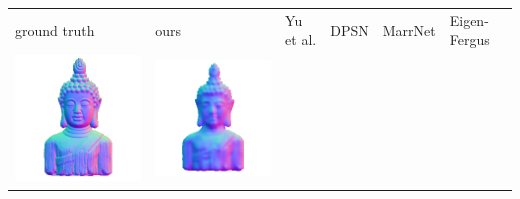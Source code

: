 \begin{center}
\begin{tabularx}{\linewidth}{@{}Y@{}Y@{}Y@{}Y@{}Y@{}Y@{}}
ground truth & ours & Yu et al. & DPSN & MarrNet & Eigen-Fergus \\
\includegraphics[width=\linewidth]{semisynthetic/20150514_16_gt.png} &
\includegraphics[width=\linewidth]{semisynthetic/20150514_16_ours_out.png} &

\end{tabularx}
\end{center}
